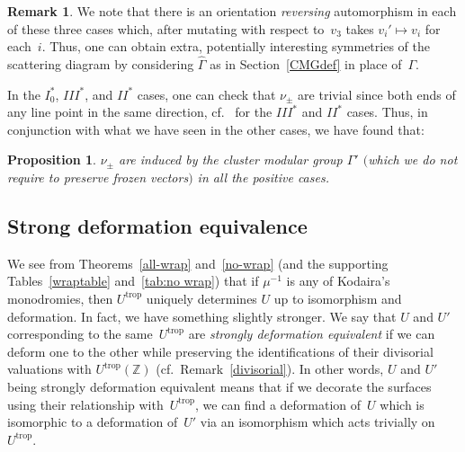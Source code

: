 \documentclass[pdftex]{sigma}
\numberwithin{equation}{section}
\numberwithin{figure}{section}
\numberwithin{table}{section}
\DeclareMathOperator{\trop}{trop}
\let\bb=\mathbb
\let\wh=\widehat
\newtheorem{prop}[thm]{Proposition}
\theoremstyle{definition}
\newtheorem{rmk}[thm]{Remark}
\begin{document}
\begin{rmk}\label{ExtendedModular}We note that there is an orientation {\it reversing} automorphism in each of these three cases which, after mutating with respect to~$v_3$ takes $v_i'\mapsto v_i$ for each~$i$. Thus, one can obtain extra, potentially interesting symmetries of the scattering diagram by considering $\wh{\Gamma}$ as in Section~\ref{CMGdef} in place of~$\Gamma$.
\end{rmk}

In the $I_0^*$, $III^*$, and $II^*$ cases, one can check that $\nu_{\pm}$ are trivial since both ends of any line point in the same direction, cf.\ \cite[Fig.~4.2(c,d)]{Man1} for the $III^*$ and $II^*$ cases. Thus, in conjunction with what we have seen in the other cases, we have found that:
\begin{prop}\label{nuAut}$\nu_{\pm}$ are induced by the cluster modular group $\Gamma'$ $($which we do not require to preserve frozen vectors$)$ in all the positive cases.
\end{prop}

\subsection{Strong deformation equivalence}

We see from Theorems~\ref{all-wrap} and~\ref{no-wrap} (and the supporting Tables~\ref{wraptable} and~\ref{tab:no wrap}) that if $\mu^{-1}$ is any of Kodaira's monodromies, then $U^{\trop}$ uniquely determines $U$ up to isomorphism and deformation. In fact, we have something slightly stronger. We say that $U$ and $U'$ corresponding to the same~$U^{\trop}$ are {\it strongly deformation equivalent} if we can deform one to the other while preserving the identifications of their divisorial valuations with $U^{\trop}(\bb{Z})$ (cf.\ Remark~\ref{divisorial}). In other words, $U$ and $U'$ being strongly deformation equivalent means that if we decorate the surfaces using their relationship with~$U^{\trop}$, we can find a deformation of~$U$ which is isomorphic to a deformation of~$U'$ via an isomorphism which acts trivially on~$U^{\trop}$.
\end{document}
